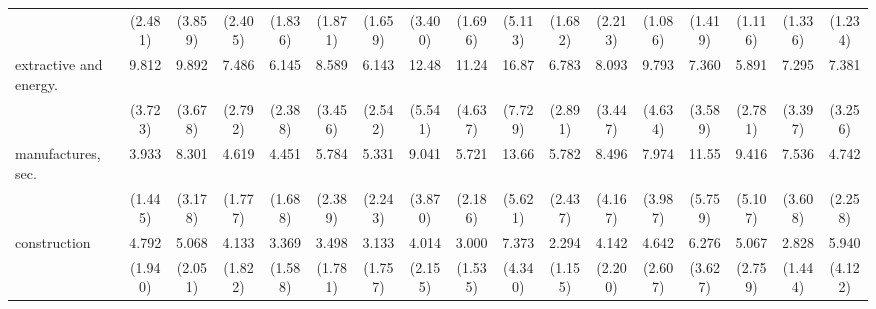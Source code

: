 {\begin{tabular}{l*{16}{c}}
                    &     (2.481)         &     (3.859)         &     (2.405)         &     (1.836)         &     (1.871)         &     (1.659)         &     (3.400)         &     (1.696)         &     (5.113)         &     (1.682)         &     (2.213)         &     (1.086)         &     (1.419)         &     (1.116)         &     (1.336)         &     (1.234)         \\
[1em]
extractive and energy.&       9.812\sym{***}&       9.892\sym{***}&       7.486\sym{***}&       6.145\sym{***}&       8.589\sym{***}&       6.143\sym{***}&       12.48\sym{***}&       11.24\sym{***}&       16.87\sym{***}&       6.783\sym{***}&       8.093\sym{***}&       9.793\sym{***}&       7.360\sym{***}&       5.891\sym{***}&       7.295\sym{***}&       7.381\sym{***}\\
                    &     (3.723)         &     (3.678)         &     (2.792)         &     (2.388)         &     (3.456)         &     (2.542)         &     (5.541)         &     (4.637)         &     (7.729)         &     (2.891)         &     (3.447)         &     (4.634)         &     (3.589)         &     (2.781)         &     (3.397)         &     (3.256)         \\
[1em]
manufactures, sec.  &       3.933\sym{***}&       8.301\sym{***}&       4.619\sym{***}&       4.451\sym{***}&       5.784\sym{***}&       5.331\sym{***}&       9.041\sym{***}&       5.721\sym{***}&       13.66\sym{***}&       5.782\sym{***}&       8.496\sym{***}&       7.974\sym{***}&       11.55\sym{***}&       9.416\sym{***}&       7.536\sym{***}&       4.742\sym{**} \\
                    &     (1.445)         &     (3.178)         &     (1.777)         &     (1.688)         &     (2.389)         &     (2.243)         &     (3.870)         &     (2.186)         &     (5.621)         &     (2.437)         &     (4.167)         &     (3.987)         &     (5.759)         &     (5.107)         &     (3.608)         &     (2.258)         \\
[1em]
construction        &       4.792\sym{***}&       5.068\sym{***}&       4.133\sym{**} &       3.369\sym{**} &       3.498\sym{*}  &       3.133\sym{*}  &       4.014\sym{**} &       3.000\sym{*}  &       7.373\sym{***}&       2.294         &       4.142\sym{**} &       4.642\sym{**} &       6.276\sym{**} &       5.067\sym{**} &       2.828\sym{*}  &       5.940\sym{*}  \\
                    &     (1.940)         &     (2.051)         &     (1.822)         &     (1.588)         &     (1.781)         &     (1.757)         &     (2.155)         &     (1.535)         &     (4.340)         &     (1.155)         &     (2.200)         &     (2.607)         &     (3.627)         &     (2.759)         &     (1.444)         &     (4.122)         \\

\end{tabular}}
